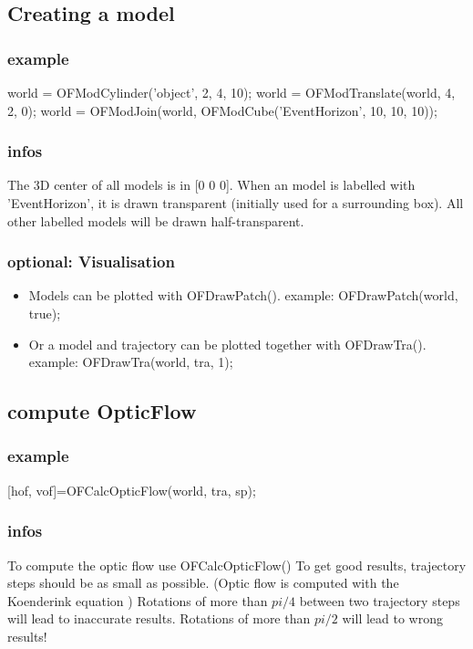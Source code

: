 \documentclass[a4paper]{article}
\begin{document}
\subsection{Creating a model}
\subsubsection{example}
  world = OFModCylinder('object', 2, 4, 10); \newline
  world = OFModTranslate(world, 4, 2, 0); \newline
  world = OFModJoin(world, OFModCube('EventHorizon', 10, 10, 10));\newline

\subsubsection{infos}
The 3D center of all models is in [0 0 0].\newline
When an model is labelled with 'EventHorizon', it is drawn transparent
(initially used for a surrounding box). All other labelled models will be drawn half-transparent.

\subsubsection{optional: Visualisation} 
 
 \begin{itemize}
  \item Models can be plotted with OFDrawPatch().\newline
example:    OFDrawPatch(world, true);
\item Or a model and trajectory can be plotted together with OFDrawTra(). \newline
example:    OFDrawTra(world, tra, 1);
\end{itemize}

\subsection{compute OpticFlow} 
\subsubsection{example} 
[hof, vof]=OFCalcOpticFlow(world, tra, sp);

\subsubsection{infos} 
To compute the optic flow use OFCalcOpticFlow()
To get good results, trajectory steps should be as small as possible.
(Optic flow is computed with the Koenderink equation \cite{koenderink})
Rotations of more than $pi/4$ between two trajectory steps will lead to inaccurate results. Rotations of more than $pi/2$ will lead to wrong results!
\end{document}
